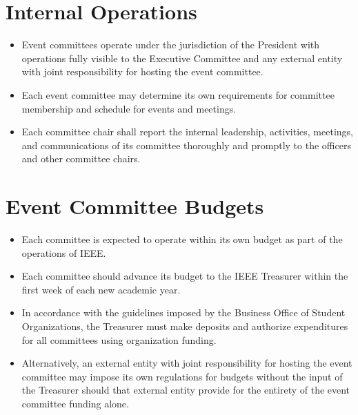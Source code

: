 \documentclass[12pt]{constitution}
\begin{document}
\section{Internal Operations}
\label{sec:event_operate}
\begin{itemize}
    \item Event committees operate under the jurisdiction of the President with operations fully visible to the Executive Committee and any external entity with joint responsibility for hosting the event committee.
    \item Each event committee may determine its own requirements for committee membership and schedule for events and meetings.
    \item Each committee chair shall report the internal leadership, activities, meetings, and communications of its committee thoroughly and promptly to the officers and other committee chairs.
\end{itemize}

\section{Event Committee Budgets}
\label{sec:event_budget}
\begin{itemize}
    \item Each committee is expected to operate within its own budget as part of the operations of IEEE.
    \item Each committee should advance its budget to the IEEE Treasurer within the first week of each new academic year.
    \item In accordance with the guidelines imposed by the Business Office of Student Organizations, the Treasurer must make deposits and authorize expenditures for all committees using organization funding.
    \item Alternatively, an external entity with joint responsibility for hosting the event committee may impose its own regulations for budgets without the input of the Treasurer should that external entity provide for the entirety of the event committee funding alone.
\end{itemize}
\end{document}
